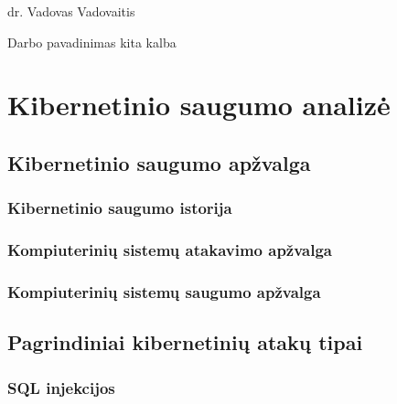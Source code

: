 \documentclass[a4paper,12pt,fleqn]{article}
\begin{document}
 {}{}{}{}%
 {dr. Vadovas Vadovaitis}

\tableofcontents



\bothabstracts{}%
{Darbo pavadinimas kita kalba} %
{}%






\newpage
\section{Kibernetinio saugumo analizė}
\label{sec:motivation}
\subsection{Kibernetinio saugumo apžvalga}


\subsubsection{Kibernetinio saugumo istorija}

\subsubsection{Kompiuterinių sistemų atakavimo apžvalga}

\subsubsection{Kompiuterinių sistemų saugumo apžvalga}

\subsection{Pagrindiniai kibernetinių atakų tipai}
\subsubsection{SQL injekcijos}
\end{document}
